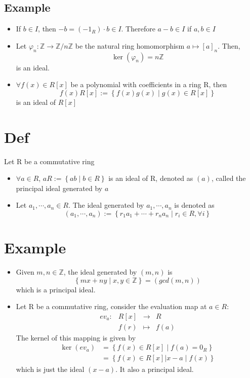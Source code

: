 \documentclass{book}
\newcommand{\set}[1]{\left\{#1\right\}}
\begin{document}
\subsection*{Example}
\begin{itemize}
	\item If $b\in I$, then $-b=(-1_R)\cdot b\in I$. Therefore $a-b\in I$ if $a,b\in I$
	\item Let $\varphi_n:\mathbb Z\to\mathbb Z/n\mathbb Z$ be the natural ring homomorphism $a\mapsto[a]_n$. Then, $$\ker(\varphi_n)=n\mathbb Z$$is an ideal.
	\item $\forall f(x)\in R[x]$ be a polynomial with coefficients in a ring R, then $$f(x)R[x]:=\set{f(x)g(x)\mid g(x)\in R[x]}$$
	is an ideal of $R[x]$
\end{itemize}
\section{Def}
Let R be a commutative ring
\begin{itemize}
	\item $\forall a\in R$, $aR:=\set{ab\mid b\in R}$ is an ideal of R, denoted as $(a)$, called the principal ideal generated by $a$
	\item Let $a_1,\cdots, a_n\in R$. The ideal generated by $a_1,\cdots,a_n$ is denoted as $$(a_1,\cdots,a_n):=\set{r_1a_1+\cdots+r_na_n\mid r_i\in R,\forall i}$$
\end{itemize}
\section{Example}
\begin{itemize}
	\item Given $m,n\in \mathbb Z$, the ideal generated by $(m,n)$ is $$\set{mx+ny\mid x,y\in \mathbb Z}=(gcd(m,n))$$which is a principal ideal.
	\item Let R be a commutative ring, consider the evaluation map at $a\in R$:$$\begin{aligned}
		ev_a:&R[x]&\to&R\\ &f(r)&\mapsto&f(a)
	\end{aligned}$$The kernel of this mapping is given by$$\begin{aligned}
		\ker(ev_a)&=\set{f(x)\in R[x]\mid f(a)=0_R}\\ &=\set{f(x)\in R[x]\left| x-a\mid f(x)\right.}
	\end{aligned}$$
	which is just the ideal $(x-a)$. It also a principal ideal.
\end{itemize}
\end{document}

